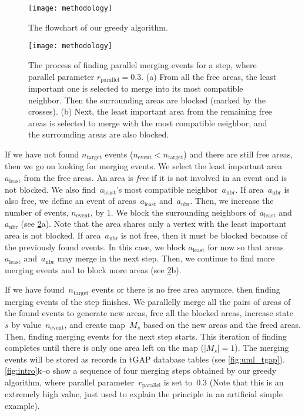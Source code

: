 \documentclass[]{interact}
\begin{document}
\begin{figure}[tb]
\centering
\texttt{[image: methodology]}
\caption{The flowchart of our greedy algorithm.
}
\label{fig:greedy_framework}
\end{figure}


\begin{figure}[tb]
\centering
\texttt{[image: methodology]}
\caption{The process of finding parallel merging events for a step, 
    where parallel parameter $r_\mathrm{parallel} = 0.3$.
    (a) From all the free areas,
	the least important one is selected to merge into
	its most compatible neighbor.
	Then the surrounding areas are blocked (marked by the crosses).
	(b) Next, the least important area from the remaining free areas
	is selected to merge with the most compatible neighbor,
	and the surrounding areas are also blocked.
}
\label{fig:blocked_polygons}
\end{figure}

If we have not found $n_\mathrm{target}$ events 
($n_\mathrm{event} < n_\mathrm{target}$)
and there are still free areas,
then we go on looking for merging events.
We select the least important area~$a_\mathrm{least}$
from the free areas.
An area is \emph{free} if 
it is not involved in an event and is not blocked.
We also find~$a_\mathrm{least}$'s 
most compatible neighbor~$a_\mathrm{nbr}$.
If area~$a_\mathrm{nbr}$ is also free, 
we define an event of areas~$a_\mathrm{least}$ and~$a_\mathrm{nbr}$.
Then, we increase the number of events, $n_\mathrm{event}$, by 1.
We block the surrounding neighbors of~$a_\mathrm{least}$ and~$a_\mathrm{nbr}$
(see \fig\ref{fig:blocked_polygons}a).
Note that the area shares only a vertex 
with the least important area is not blocked.
If area~$a_\mathrm{nbr}$ is not free,
then it must be blocked because of the previously found events.
In this case, we block $a_\mathrm{least}$ for now
so that areas~$a_\mathrm{least}$ and~$a_\mathrm{nbr}$ 
may merge in the next step.
Then, we continue to find more merging events and to block more areas
(see \fig\ref{fig:blocked_polygons}b).

If we have found~$n_\mathrm{target}$ events 
or there is no free area anymore,
then finding merging events of the step finishes.
We parallelly merge all the pairs of areas of the found events
to generate new areas,
free all the blocked areas,
increase state~$s$ by value~$n_\mathrm{event}$,
and create map~$M_s$ based on the new areas and the freed areas.
Then, finding merging events for the next step starts.
This iteration of finding completes 
until there is only one area left on the map ($|M_s|=1$).
The merging events will be stored as records in tGAP database tables
(see \fig\ref{fig:uml_tgap}).
\figs\ref{fig:intro}k--o show a sequence of four merging steps
obtained by our greedy algorithm,
where parallel parameter~$r_\mathrm{parallel}$ is set to~$0.3$
(Note that this is an extremely high value, 
just used to explain the principle in an artificial simple example).
\end{document}
